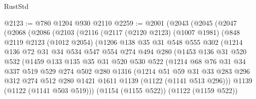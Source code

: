 \begin{lexlean}{RustStd}
\begin{coremodule}
@2123 := @780 @1204 @930 @2110
@2259 := @2001
    (@2043
      (@2045
        (@2047
          (@2068
            (@2086
              (@2103
                (@2116
                  (@2117
                    (@2120 @2123)
                    (@1007 @1981)
                    (@848
                      @2119
                      @2123
                      (@1012 @2054)
                      (@1206
                        @138
                        @35
                        @31
                        @548
                        @555
                        @302
                        (@1214
                          @136
                          @72
                          @31
                          @34
                          @534
                          @547
                          @554
                          @274
                          @494
                          @280
                          (@1453
                            @136
                            @31
                            @520
                            @532
                            (@1459
                              @133
                              @135
                              @35
                              @31
                              @520
                              @530
                              @522
                              (@1214
                                @68
                                @76
                                @31
                                @34
                                @337
                                @519
                                @529
                                @274
                                @502
                                @280
                                @1316
                                (@1214
                                  @51
                                  @59
                                  @31
                                  @33
                                  @283
                                  @296
                                  @312
                                  @274
                                  @512
                                  @280
                                  @1421
                                  @1611
                                  @1139
                                  (@1122 (@1141 @513 @296)))
                                @1139
                                (@1122 (@1141 @503 @519)))
                              (@1154 (@1155 @522))
                              (@1122 (@1159 @522))

\end{coremodule}
\end{lexlean}
